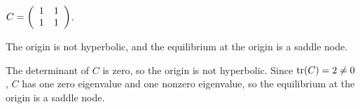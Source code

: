 \documentclass{ximera}
\begin{document}
\begin{exercise}  \label{E:PQd}
$C = \left(\begin{array}{rr} 1 & 1\\ 1 &1\end{array}\right)$.

\begin{solution}
\ans The origin is not hyperbolic, and the equilibrium at
the origin is a saddle node.

\soln The determinant of $C$ is zero, so the origin is not hyperbolic.
Since ${\rm tr}(C) = 2 \neq 0$, $C$ has one zero eigenvalue and one
nonzero eigenvalue, so the equilibrium at the origin is a saddle node.

\end{solution}
\end{exercise}
\end{document}
